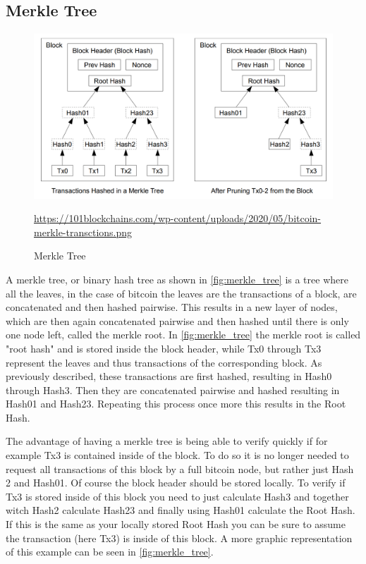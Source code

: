 \subsection{Merkle Tree}
\label{sec:Basics:MerkleTree}
\begin{figure}[!ht]
    \centering
    \includegraphics[width=(\textwidth * 2 / 3 )]{Ausarbeitung/images/MerkleTree.png}
    \caption[Merkle Tree]{Merkle Tree}
    \small \url{https://101blockchains.com/wp-content/uploads/2020/05/bitcoin-merkle-transctions.png} 
    \label{fig:merkle_tree}
\end{figure}
A merkle tree, or binary hash tree as shown in \autoref{fig:merkle_tree} is a tree where all the leaves, in the case of bitcoin the leaves are the transactions of a block, are concatenated and then hashed pairwise. This results in a new layer of nodes, which are then again concatenated pairwise and then hashed until there is only one node left, called the merkle root. In \autoref{fig:merkle_tree} the merkle root is called "root hash" and is stored inside the block header, while Tx0 through Tx3 represent the leaves and thus transactions of the corresponding block. As previously described, these transactions are first hashed, resulting in Hash0 through Hash3. Then they are concatenated pairwise and hashed resulting in Hash01 and Hash23. Repeating this process once more this results in the Root Hash. 

The advantage of having a merkle tree is being able to verify quickly if for example Tx3 is contained inside of the block. To do so it is no longer needed to request all transactions of this block by a full bitcoin node, but rather just Hash 2 and Hash01. Of course the block header should be stored locally. To verify if Tx3 is stored inside of this block you need to just calculate Hash3 and together witch Hash2 calculate Hash23 and finally using Hash01 calculate the Root Hash. If this is the same as your locally stored Root Hash you can be sure to assume the transaction (here Tx3) is inside of this block. A more graphic representation of this example can be seen in \autoref{fig:merkle_tree}.



